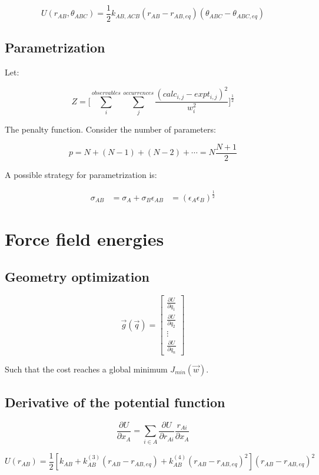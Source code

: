 	$$U(r_{AB}, \theta_{ABC}) = \frac{1}{2}k_{AB,ACB}(r_{AB}-r_{AB, eq})(\theta_{ABC}-\theta_{ABC, eq})$$

	\subsection{Parametrization}
	Let:

	$$Z = \biggl[\sum\limits_{i}^{observables}\sum\limits_{j}^{occurrences}\frac{(calc_{i,j}-expt_{i,j})^2}{w_i^2}\biggr]^{\frac{1}{2}}$$

	The penalty function.
	Consider the number of parameters:

	$$p = N + (N-1)+(N-2)+\cdots = N\frac{N+1}{2}$$

	A possible strategy for parametrization is:

	\begin{align*}
		\sigma_{AB} &= \sigma_A+\sigma_B
		\epsilon_{AB} &= (\epsilon_A\epsilon_B)^{\frac{1}{2}}
	\end{align*}

\section{Force field energies}

	\subsection{Geometry optimization}

	$$\vec{g}(\vec{q}) = \begin{bmatrix} \frac{\partial U}{\partial q_1} \\ \frac{\partial U}{\partial q_2} \\ \vdots \\ \frac{\partial U}{\partial q_n}\end{bmatrix}$$

	Such that the cost reaches a global minimum $J_{min}(\vec{w})$.

	\subsection{Derivative of the potential function}

	$$\frac{\partial U}{\partial x_A} = \sum\limits_{i\in A}\frac{\partial U}{\partial r_{Ai}}\frac{r_{Ai}}{\partial x_A}$$

	$$U(r_{AB}) = \frac{1}{2}[k_{AB}+k_{AB}^{(3)}(r_{AB}-r_{AB, eq}) + k_{AB}^{(4)}(r_{AB}-r_{AB, eq})^2](r_{AB}-r_{AB,eq})^2$$

